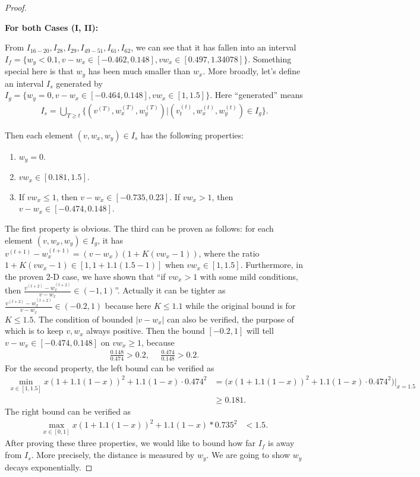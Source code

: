\documentclass{article}
\theoremstyle{plain}
\theoremstyle{remark}
\newcommand{\T}[1]{^{(#1)}}
\def\t{^{(t)}}
\def\tt{^{(t+1)}}
\begin{document}
\begin{proof}
\begin{enumerate}
\end{enumerate}

\textbf{For both Cases (I, II):}

From $I_{16-20}, I_{28}, I_{29}, I_{49-51}, I_{61}, I_{62}$, we can see that it has fallen into an interval $I_f=\{w_y<0.1, v-w_x\in[-0.462,0.148], vw_x\in[0.497,1.34078]\}$. Something special here is that $w_y$ has been much smaller than $w_x$. More broadly, let's define an interval $I_s$ generated by $I_g=\{w_y=0, v-w_x\in[-0.464,0.148], vw_x\in[1,1.5]\}$. Here ``generated'' means
\begin{align}
    I_s = \bigcup_{T\ge t} \{(v\T{T}, w_x\T{T}, w_y\T{T})|(v_t\t, w_x\t, w_y\t)\in I_g\}.
\end{align}

Then each element $(v,w_x,w_y)\in I_s$ has the following properties:
\begin{enumerate}
    \item $w_y=0$.
    \item $vw_x\in[0.181,1.5]$.
    \item If $vw_x\le 1$, then $v-w_x\in [-0.735, 0.23]$. If $vw_x>1$, then $v-w_x\in [-0.474, 0.148]$.
\end{enumerate}
The first property is obvious. The third can be proven as follows: for each element $(v, w_x, w_y)\in I_g$, it has $v\tt-w_x\tt=(v-w_x)\left(1+K(vw_x-1)\right)$, where the ratio $1+K(vw_x-1)\in[1,1+1.1(1.5-1)]$ when $vw_x\in[1,1.5]$. Furthermore, in the proven 2-D case, we have shown that ``if $vw_x>1$ with some mild conditions, then $\frac{v\T{t+2}-w_x\T{t+2}}{v-w_x}\in(-1,1)$''. Actually it can be tighter as $\frac{v\T{t+2}-w_x\T{t+2}}{v-w_x}\in(-0.2,1)$ because here $K\le 1.1$ while the original bound is for $K\le 1.5$. The condition of bounded $|v-w_x|$ can also be verified, the purpose of which is to keep $v,w_x$ always positive. Then the bound $[-0.2,1]$ will tell $v-w_x\in[-0.474,0.148]$ on $vw_x\ge 1$, because
\begin{align*}
    \frac{0.148}{0.474}>0.2,  ~~~~~~\frac{0.474}{0.148}>0.2.
\end{align*}
For the second property, the left bound can be verified as 
\begin{align*}
    \min_{x\in[1,1.5]}x(1+1.1(1-x))^2 + 1.1(1-x)\cdot 0.474^2 &= \bigg(x(1+1.1(1-x))^2 + 1.1(1-x)\cdot 0.474^2\bigg) \bigg|_{x=1.5} \\
    & \ge 0.181.
\end{align*}
The right bound can be verified as
\begin{align*}
    \max_{x\in[0,1]}x(1+1.1(1-x))^2 + 1.1(1-x)*0.735^2 &<1.5.
\end{align*}
After proving these three properties, we would like to bound how far $I_f$ is away from $I_s$. More precisely, the distance is measured by $w_y$. We are going to show $w_y$ decays exponentially.


\end{proof}
\end{document}
